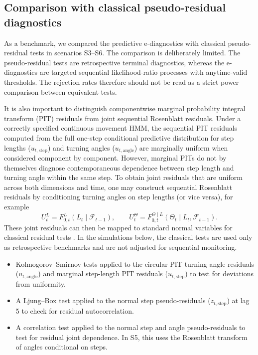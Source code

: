 \documentclass[pdflatex,sn-basic]{sn-jnl}
\theoremstyle{thmstyleone}
\theoremstyle{thmstyletwo}
\theoremstyle{thmstylethree}
\newcommand{\1}{\mathbf 1}
\newcommand{\calF}{\mathcal F}
\begin{document}
\subsection{Comparison with classical pseudo-residual diagnostics}
\label{sec:comparison_pseudo_residuals}
As a benchmark, we compared the predictive e-diagnostics with classical pseudo-residual tests in scenarios S3--S6. The comparison is deliberately limited. The pseudo-residual tests are retrospective terminal diagnostics, whereas the e-diagnostics are targeted sequential likelihood-ratio processes with anytime-valid thresholds. The rejection rates therefore should not be read as a strict power comparison between equivalent tests.

It is also important to distinguish componentwise marginal probability integral transform (PIT) residuals from joint sequential Rosenblatt residuals. Under a correctly specified continuous movement HMM, the sequential PIT residuals computed from the full one-step conditional predictive distribution for step lengths ($u_{t,\text{step}}$) and turning angles ($u_{t,\text{angle}}$) are marginally uniform when considered component by component. However, marginal PITs do not by themselves diagnose contemporaneous dependence between step length and turning angle within the same step. To obtain joint residuals that are uniform across both dimensions and time, one may construct sequential Rosenblatt residuals by conditioning turning angles on step lengths (or vice versa), for example
\[
 U_t^L = F_{0,t}^L(L_t \mid \calF_{t-1}),\qquad
 U_t^\Theta = F_{0,t}^{\Theta\mid L}(\Theta_t \mid L_t,\calF_{t-1}).
\]
These joint residuals can then be mapped to standard normal variables for classical residual tests \citep{zucchini_2016_hmm}. In the simulations below, the classical tests are used only as retrospective benchmarks and are not adjusted for sequential monitoring.


\begin{itemize}
\item Kolmogorov--Smirnov tests applied to the circular PIT turning-angle residuals ($u_{t,\text{angle}}$) and marginal step-length PIT residuals ($u_{t,\text{step}}$) to test for deviations from uniformity.
\item A Ljung--Box test applied to the normal step pseudo-residuals ($z_{t,\text{step}}$) at lag 5 to check for residual autocorrelation.
\item A correlation test applied to the normal step and angle pseudo-residuals to test for residual joint dependence. In S5, this uses the Rosenblatt transform of angles conditional on steps.
\end{itemize}
\end{document}
